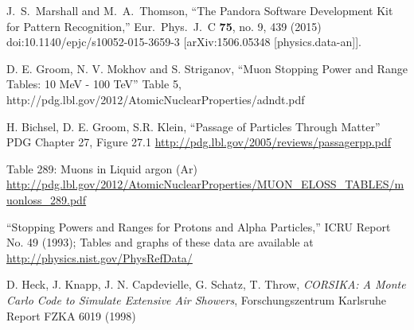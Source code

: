 \documentclass[a4paper,11pt]{article}
\begin{document}
\begin{thebibliography}{99}



  J.~S.~Marshall and M.~A.~Thomson,
  ``The Pandora Software Development Kit for Pattern Recognition,''
  Eur.\ Phys.\ J.\ C {\bf 75}, no. 9, 439 (2015)
  doi:10.1140/epjc/s10052-015-3659-3
  [arXiv:1506.05348 [physics.data-an]].

  D. E. Groom, N. V. Mokhov and S. Striganov, ``Muon Stopping Power and Range Tables: 10 MeV - 100 TeV'' Table 5,
  http://pdg.lbl.gov/2012/AtomicNuclearProperties/adndt.pdf

  H. Bichsel, D. E. Groom, S.R. Klein, ``Passage of Particles Through Matter'' PDG Chapter 27, Figure 27.1 \url{http://pdg.lbl.gov/2005/reviews/passagerpp.pdf}

   Table 289: Muons in Liquid argon (Ar) \url{http://pdg.lbl.gov/2012/AtomicNuclearProperties/MUON_ELOSS_TABLES/muonloss_289.pdf}

   ``Stopping Powers and Ranges for Protons and Alpha Particles,'' ICRU Report No. 49 (1993); Tables and graphs of these data are available at \url{http://physics.nist.gov/PhysRefData/}

   D. Heck, J. Knapp, J. N. Capdevielle, G. Schatz, T. Throw, \emph{CORSIKA: A Monte Carlo Code to Simulate Extensive Air Showers}, Forschungszentrum Karlsruhe Report FZKA 6019 (1998)









\end{thebibliography}
\end{document}
